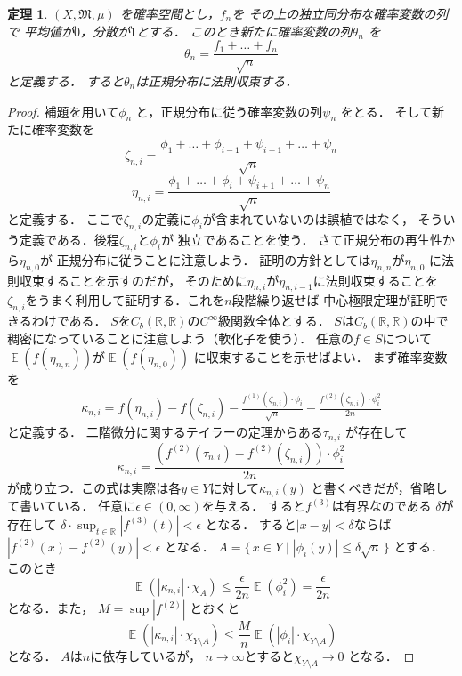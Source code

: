 \documentclass[leqno, 12pt]{jsarticle}
\newtheorem{thm}{定理}
\newcommand{\rr}{\mathbb{R}}
\DeclareMathOperator{\mean}{\mathbb{E}}
\begin{document}
\begin{thm}
$(X, \mathfrak{M}, \mu)$
を確率空間とし，$f_{n}$を
その上の独立同分布な確率変数の列で
平均値が$0$，分散が$1$とする．
このとき新たに確率変数の列$\theta_{n}$
を
\[
\theta_{n}=\frac{f_{1}+\dots +f_{n}}{\sqrt{n}}
\]
と定義する．
すると$\theta_{n}$は正規分布に法則収束する．
\end{thm}
\begin{proof}
補題を用いて$\phi_{n}$
と，正規分布に従う確率変数の列$\psi_{n}$
をとる．
そして新たに確率変数を
\[
\zeta_{n, i}
=
\frac{\phi_{1}+\dots +\phi_{i-1}+\psi_{i+1}+\dots+\psi_{n}}{\sqrt{n}}
\]
\[
\eta_{n, i}=\frac{\phi_{1}+\dots +\phi_{i}+\psi_{i+1}+\dots+\psi_{n}}{\sqrt{n}}
\]
と定義する．
ここで$\zeta_{n, i}$の定義に$\phi_{i}$が含まれていないのは誤植ではなく，
そういう定義である．後程$\zeta_{n, i}$と$\phi_{i}$が
独立であることを使う．
さて正規分布の再生性から$\eta_{n, 0}$が
正規分布に従うことに注意しよう．
証明の方針としては$\eta_{n, n}$が$\eta_{n,  0}$
に法則収束することを示すのだが，
そのために$\eta_{n, i}$が$\eta_{n, i-1}$に法則収束することを
$\zeta_{n, i}$をうまく利用して証明する．これを$n$段階繰り返せば
中心極限定理が証明できるわけである．
$S$を$C_{b}(\rr, \rr)$の$C^{\infty}$級関数全体とする．
$S$は$C_{b}(\rr, \rr)$の中で稠密になっていることに注意しよう（軟化子を使う）．
任意の$f\in S$について
$\mean(f(\eta_{n, n}))$が$\mean(f(\eta_{n, 0}))$
に収束することを示せばよい．
まず確率変数を
\begin{align*}
\kappa_{n, i}=
f(\eta_{n, i})-f(\zeta_{n, i})-\frac{f^{(1)}(\zeta_{n, i})\cdot \phi_{i}}{\sqrt{n}}
-\frac{f^{(2)}(\zeta_{n, i})\cdot \phi_{i}^2}{2n}
\end{align*}
と定義する．
二階微分に関するテイラーの定理からある$\tau_{n, i}$
が存在して
\[
\kappa_{n, i}=
\frac{(f^{(2)}(\tau_{n, i})-f^{(2)}(\zeta_{n, i}))\cdot \phi_{i}^2}{2n}
\]
が成り立つ．この式は実際は各$y\in Y$に対して$\kappa_{n, i}(y)$
と書くべきだが，省略して書いている．
任意に$\epsilon\in (0, \infty)$を与える．
すると$f^{(3)}$は有界なのである $\delta$が存在して
$\delta\cdot \sup_{t\in \rr}|f^{(3)}(t)|<\epsilon$
となる．
すると$|x-y|<\delta$ならば
$|f^{(2)}(x)-f^{(2)}(y)|<\epsilon$
となる．
$A=\{\, x\in Y\mid |\phi_{i}(y)|\le \delta\sqrt{n}\, \}$
とする．
このとき
\[
\mean(|\kappa_{n, i}|\cdot \chi_{A})
\le \frac{\epsilon}{2n}\mean(\phi_{i}^2)= \frac{\epsilon}{2n}
\]
となる．また，
$M=\sup|f^{(2)}|$
とおくと
\[
\mean(|\kappa_{n, i}|\cdot \chi_{Y\setminus A})
\le 
\frac{M}{n}\mean(|\phi_{i}|\cdot \chi_{Y\setminus A})
\]
となる．
$A$は$n$に依存しているが，
$n\to \infty$とすると$\chi_{Y\setminus A}\to 0$
となる．

\end{proof}
\end{document}
